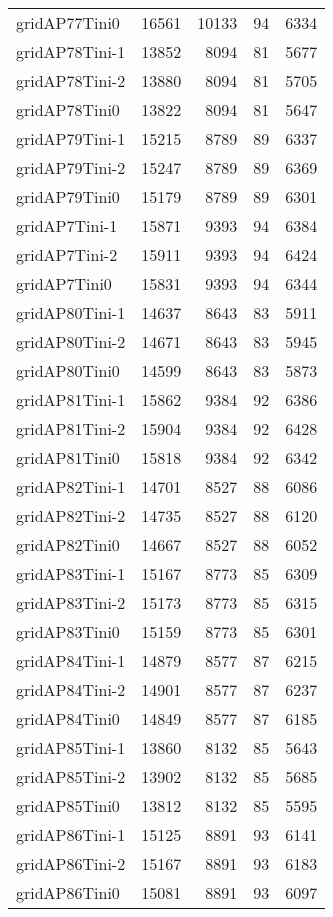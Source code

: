 \begin{longtable}{lrrrr}
gridAP77Tini0 & 16561 & 10133 & 94 & 6334 \\
gridAP78Tini-1 & 13852 & 8094 & 81 & 5677 \\
gridAP78Tini-2 & 13880 & 8094 & 81 & 5705 \\
gridAP78Tini0 & 13822 & 8094 & 81 & 5647 \\
gridAP79Tini-1 & 15215 & 8789 & 89 & 6337 \\
gridAP79Tini-2 & 15247 & 8789 & 89 & 6369 \\
gridAP79Tini0 & 15179 & 8789 & 89 & 6301 \\
gridAP7Tini-1 & 15871 & 9393 & 94 & 6384 \\
gridAP7Tini-2 & 15911 & 9393 & 94 & 6424 \\
gridAP7Tini0 & 15831 & 9393 & 94 & 6344 \\
gridAP80Tini-1 & 14637 & 8643 & 83 & 5911 \\
gridAP80Tini-2 & 14671 & 8643 & 83 & 5945 \\
gridAP80Tini0 & 14599 & 8643 & 83 & 5873 \\
gridAP81Tini-1 & 15862 & 9384 & 92 & 6386 \\
gridAP81Tini-2 & 15904 & 9384 & 92 & 6428 \\
gridAP81Tini0 & 15818 & 9384 & 92 & 6342 \\
gridAP82Tini-1 & 14701 & 8527 & 88 & 6086 \\
gridAP82Tini-2 & 14735 & 8527 & 88 & 6120 \\
gridAP82Tini0 & 14667 & 8527 & 88 & 6052 \\
gridAP83Tini-1 & 15167 & 8773 & 85 & 6309 \\
gridAP83Tini-2 & 15173 & 8773 & 85 & 6315 \\
gridAP83Tini0 & 15159 & 8773 & 85 & 6301 \\
gridAP84Tini-1 & 14879 & 8577 & 87 & 6215 \\
gridAP84Tini-2 & 14901 & 8577 & 87 & 6237 \\
gridAP84Tini0 & 14849 & 8577 & 87 & 6185 \\
gridAP85Tini-1 & 13860 & 8132 & 85 & 5643 \\
gridAP85Tini-2 & 13902 & 8132 & 85 & 5685 \\
gridAP85Tini0 & 13812 & 8132 & 85 & 5595 \\
gridAP86Tini-1 & 15125 & 8891 & 93 & 6141 \\
gridAP86Tini-2 & 15167 & 8891 & 93 & 6183 \\
gridAP86Tini0 & 15081 & 8891 & 93 & 6097 \\

\end{longtable}
